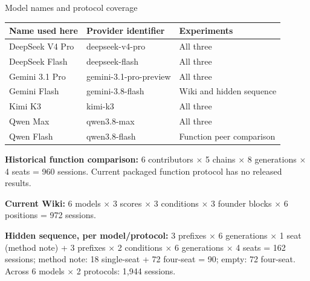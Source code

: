 \documentclass[10pt,aspectratio=169]{beamer}
\newcommand{\evidence}[1]{\par\smallskip{\scriptsize\textcolor{gray}{#1}}}
\begin{document}
\begin{frame}{Model names and protocol coverage}
  \footnotesize
  \begin{tabular}{@{}lll@{}}
    \toprule
    Name used here & Provider identifier & Experiments \\
    \midrule
    DeepSeek V4 Pro & deepseek-v4-pro & All three \\
    DeepSeek Flash & deepseek-flash & All three \\
    Gemini 3.1 Pro & gemini-3.1-pro-preview & All three \\
    Gemini Flash & gemini-3.8-flash & Wiki and hidden sequence \\
    Kimi K3 & kimi-k3 & All three \\
    Qwen Max & qwen3.8-max & All three \\
    Qwen Flash & qwen3.8-flash & Function peer comparison \\
    \bottomrule
  \end{tabular}
  \par\medskip
  \textbf{Historical function comparison:} 6 contributors $\times$ 5 chains $\times$ 8 generations
  $\times$ 4 seats = 960 sessions. Current packaged function protocol has no released results.\par\smallskip
  \textbf{Current Wiki:} 6 models $\times$ 3 scores $\times$ 3 conditions $\times$ 3 founder blocks
  $\times$ 6 positions = 972 sessions.\par\smallskip
  \textbf{Hidden sequence, per model/protocol:} 3 prefixes $\times$ 6 generations $\times$ 1 seat (method note)
  + 3 prefixes $\times$ 2 conditions $\times$ 6 generations $\times$ 4 seats = 162 sessions;
  method note: 18 single-seat + 72 four-seat = 90; empty: 72 four-seat.
  Across 6 models $\times$ 2 protocols: 1,944 sessions.
  \evidence{Historical and current protocols retain separate counts. Exact configuration bindings accompany the results.}
\end{frame}
\end{document}
